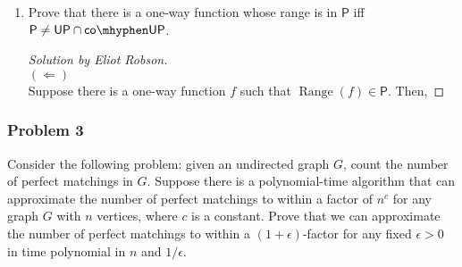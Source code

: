 \documentclass{article}
\newenvironment{solution}[1]{\begin{proof}[Solution by #1]}{\end{proof}}
\newcommand{\inp}[1]{\left\langle #1 \right\rangle} %
\DeclareMathOperator*{\Range}{Range}
\newcommand{\Pe}{\mathsf{P}}
\newcommand{\UP}{\mathsf{UP}}
\newcommand{\coUP}{\mathsf{co \mhyphen UP}}
\begin{document}
\begin{enumerate}
\begin{solution}{Eliot Robson, David Zheng, Shubhang Kulkarni, and textbook authors}
        Finally, suppose toward contradiction that there is some poly-time computable \(g\) such that \(g(f(\inp{x,y})) = \inp{x,y}\) for every \(\inp{x,y}\). Then, if we take any input \(x\), we simply compute \(z = g(\inp{x,1})\) and check if \(f(z) = \inp{x,1}\), then accept \(x\), rejecting otherwise. This procedure solves for membership in \(L\) in polynomial time, contradicting our initial assumption that \(\Pe \neq \UP\). Thus, no such \(g\) can exist and so \(f\) is one-way as desired.
    \end{solution} 
    
    \item Prove that there is a one-way function whose range is in \(\Pe\) iff \(\Pe \neq \UP \cap \coUP\).
    
    \begin{solution}{Eliot Robson}
        \hfill\\
        \((\Longleftarrow)\)\\
        Suppose there is a one-way function \(f\) such that \(\Range(f) \in \Pe\). Then, 
    \end{solution}
\end{enumerate}

\subsubsection{Problem 3}
Consider the following problem: given an undirected graph \(G\), count the number of perfect matchings in \(G\). Suppose there is a polynomial-time algorithm that can approximate the number of perfect matchings to within a factor of \(n^c\) for any graph \(G\) with \(n\) vertices, where \(c\) is a constant. Prove that we can approximate the number of perfect matchings to within a \((1 + \epsilon)\)-factor for any fixed \(\epsilon > 0\) in time polynomial in \(n\) and \(1 / \epsilon\).
\end{document}
